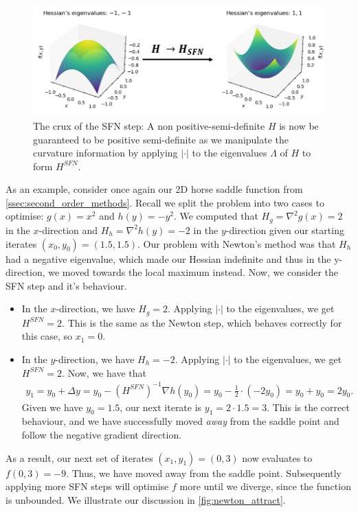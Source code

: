 \begin{figure}
    \centering
    \includegraphics[width=0.8\linewidth]{figures/4method/method_diag_1.png}
    \caption{The crux of the SFN step: A non positive-semi-definite $H$ is now be guaranteed to be positive semi-definite as we manipulate the curvature information by applying $|\cdot|$ to the eigenvalues $\Lambda$ of $H$ to form $H^{SFN}$.}
    \label{fig:guaranteed_pos_def}
\end{figure}

As an example, consider once again our 2D horse saddle function from \cref{ssec:second_order_methods}. Recall we split the problem into two cases to optimise: $g(x) = x^2$ and $h(y) = -y^2$. We computed that $H_g = \nabla^2 g(x) = 2$ in the $x$-direction and $H_h = \nabla^2 h(y) = -2$ in the $y$-direction given our starting iterates $(x_0, y_0) = (1.5, 1.5)$. Our problem with Newton's method was that $H_h$ had a negative eigenvalue, which made our Hessian indefinite and thus in the y-direction, we moved towards the local maximum instead. Now, we consider the SFN step and it's behaviour.
\begin{itemize}
    \item In the $x$-direction, we have $H_g = 2$. Applying $|\cdot|$ to the eigenvalues, we get $H^{SFN} = 2$. This is the same as the Newton step, which behaves correctly for this case, so $x_1 = 0$.
    \item In the $y$-direction, we have $H_h = -2$. Applying $|\cdot|$ to the eigenvalues, we get $H^{SFN} = 2$. Now, we have that
    \begin{align}
        y_1 = y_0 + \Delta y = y_0 - (H^{SFN})^{-1} \nabla h(y_0) = y_0 - \frac{1}{2} \cdot (-2 y_0) = y_0 + y_0 = 2y_0.
    \end{align}
    Given we have $y_0 = 1.5$, our next iterate is $y_1 = 2 \cdot 1.5 = 3$. This is the correct behaviour, and we have successfully moved \textit{away} from the saddle point and follow the negative gradient direction.
\end{itemize}
As a result, our next set of iterates $(x_1, y_1) = (0, 3)$ now evaluates to $f(0, 3) = -9$. Thus, we have moved away from the saddle point. Subsequently applying more SFN steps will optimise $f$ more until we diverge, since the function is unbounded. We illustrate our discussion in \cref{fig:newton_attract}.

